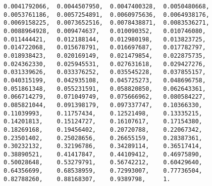 \begin{Verbatim}
  0.0041792066,  0.0044507950,  0.0047400328,  0.0050480668,
  0.0053761186,  0.0057254891,  0.0060975636,  0.0064938176,
  0.0069158225,  0.0073652516,  0.0078438871,  0.0083536271,
  0.0088964928,  0.009474637,   0.010090352,   0.010746080,
  0.011444421,   0.012188144,   0.012980198,   0.013823725,
  0.014722068,   0.015678791,   0.016697687,   0.017782797,
  0.018938423,   0.020169149,   0.021479854,   0.022875735,
  0.024362330,   0.025945531,   0.027631618,   0.029427276,
  0.031339626,   0.033376252,   0.035545228,   0.037855157,
  0.040315199,   0.042935108,   0.045725273,   0.048696758,
  0.051861348,   0.055231591,   0.058820850,   0.062643361,
  0.066714279,   0.071049749,   0.075666962,   0.080584227,
  0.085821044,   0.091398179,   0.097337747,   0.10366330,
  0.11039993,    0.11757434,    0.12521498,    0.13335215,
  0.14201813,    0.15124727,    0.16107617,    0.17154380,
  0.18269168,    0.19456402,    0.20720788,    0.22067342,
  0.23501402,    0.25028656,    0.26655159,    0.28387361,
  0.30232132,    0.32196786,    0.34289114,    0.36517414,
  0.38890521,    0.41417847,    0.44109412,    0.46975890,
  0.50028648,    0.53279791,    0.56742212,    0.60429640,
  0.64356699,    0.68538959,    0.72993007,    0.77736504,
  0.82788260,    0.88168307,    0.9389798,     1.
\end{Verbatim}
